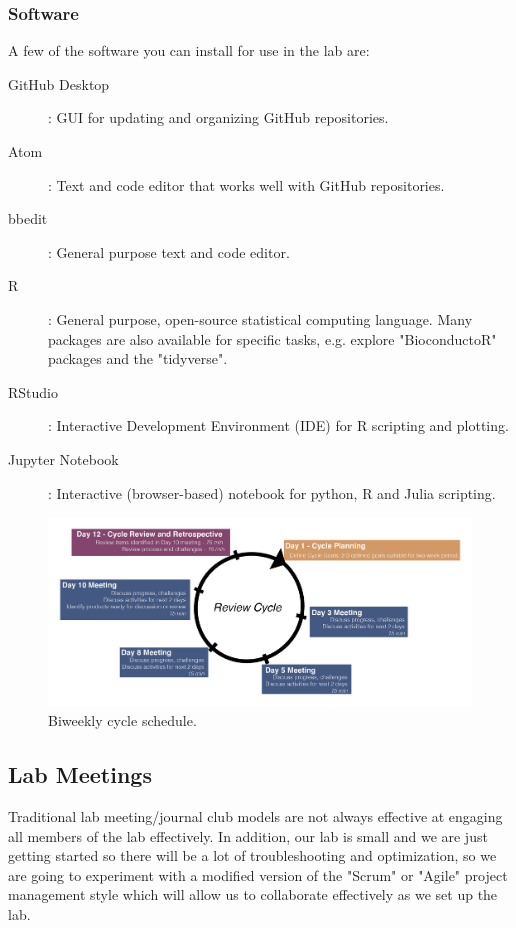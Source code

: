 \documentclass[10pt, a4paper, twocolumn]{article} %
\begin{document}
\subsubsection{Software}
A few of the software you can install for use in the lab are:
\begin{description}
\item [GitHub Desktop]: GUI for updating and organizing GitHub repositories.
\item [Atom]: Text and code editor that works well with GitHub repositories.
\item [bbedit]: General purpose text and code editor.
\item [R]: General purpose, open-source statistical computing language. Many packages are also available for specific tasks, e.g. explore "BioconductoR" packages and the "tidyverse".
\item [RStudio]: Interactive Development Environment (IDE) for R scripting and plotting.
\item [Jupyter Notebook]: Interactive (browser-based) notebook for python, R and Julia scripting.
\end{description}

\begin{figure}
  \includegraphics[width=\textwidth]{Core_Competencies-02.png}
  \caption{Biweekly cycle schedule.}
\end{figure}
\subsection{Lab Meetings}
Traditional lab meeting/journal club models are not always effective at engaging all members of the lab effectively.  In addition, our lab is small and we are just getting started so there will be a lot of troubleshooting and optimization, so we are going to experiment with a modified version of the "Scrum" or "Agile" project management style which will allow us to collaborate effectively as we set up the lab.
\end{document}
